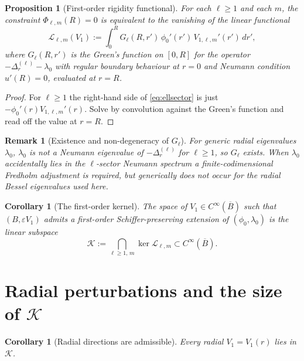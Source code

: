 \documentclass[11pt]{article}
\newcommand{\eps}{\varepsilon}
\newcommand{\1}{\mathbf 1}
\newtheorem{prop}[lem]{Proposition}
\newtheorem{cor}[lem]{Corollary}
\newtheorem{rem}[lem]{Remark}
\begin{document}
\begin{prop}[First-order rigidity functional]\label{prop:functional}
For each $\ell\ge 1$ and each $m$, the constraint
$\Phi_{\ell,m}(R)=0$ is equivalent to the vanishing of the linear
functional
\begin{equation}\label{eq:functional}
    \mathcal{L}_{\ell,m}(V_1)
    :=\int_0^R G_\ell(R,r')\,\phi_0'(r')\,V_{1,\ell,m}'(r')\,dr',
\end{equation}
where $G_\ell(R,r')$ is the Green's function on $[0,R]$ for the
operator $-\Delta_r^{(\ell)}-\lambda_0$ with regular boundary
behaviour at $r=0$ and Neumann condition $u'(R)=0$, evaluated at
$r=R$.
\end{prop}

\begin{proof}
For $\ell\ge 1$ the right-hand side of \eqref{eq:ellsector} is just
$-\phi_0'(r)V_{1,\ell,m}'(r)$. Solve by convolution against the
Green's function and read off the value at $r=R$.
\end{proof}

\begin{rem}[Existence and non-degeneracy of $G_\ell$]\label{rem:gell}
For generic radial eigenvalues $\lambda_0$, $\lambda_0$ is not a
Neumann eigenvalue of $-\Delta_r^{(\ell)}$ for $\ell\ge 1$, so
$G_\ell$ exists. When $\lambda_0$ accidentally lies in the
$\ell$-sector Neumann spectrum a finite-codimensional Fredholm
adjustment is required, but generically does not occur for the
radial Bessel eigenvalues used here.
\end{rem}

\begin{cor}[The first-order kernel]\label{cor:kernel}
The space of $V_1\in C^\infty(\overline B)$ such that
$(B,\eps V_1)$ admits a first-order Schiffer-preserving extension of
$(\phi_0,\lambda_0)$ is the linear subspace
\begin{equation}\label{eq:kernel}
    \mathcal{K}:=\bigcap_{\ell\ge 1,\,m}\ker\mathcal{L}_{\ell,m}\subset C^\infty(\overline B).
\end{equation}
\end{cor}

\section{Radial perturbations and the size of $\mathcal{K}$}

\begin{cor}[Radial directions are admissible]\label{cor:radial}
Every radial $V_1=V_1(r)$ lies in $\mathcal{K}$.
\end{cor}
\end{document}

